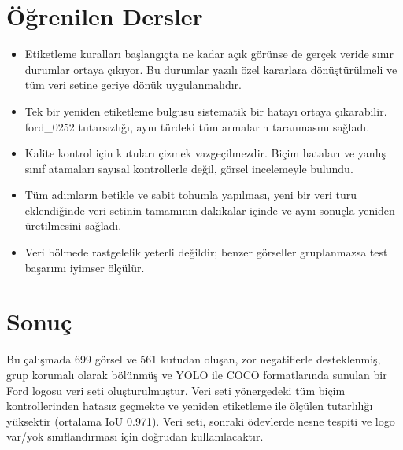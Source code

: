 \documentclass[conference]{IEEEtran}
\begin{document}
\section{Öğrenilen Dersler}

\begin{itemize}
\item Etiketleme kuralları başlangıçta ne kadar açık görünse de gerçek veride sınır durumlar
ortaya çıkıyor. Bu durumlar yazılı özel kararlara dönüştürülmeli ve tüm veri setine geriye
dönük uygulanmalıdır.
\item Tek bir yeniden etiketleme bulgusu sistematik bir hatayı ortaya çıkarabilir. ford\_0252
tutarsızlığı, aynı türdeki tüm armaların taranmasını sağladı.
\item Kalite kontrol için kutuları çizmek vazgeçilmezdir. Biçim hataları ve yanlış sınıf
atamaları sayısal kontrollerle değil, görsel incelemeyle bulundu.
\item Tüm adımların betikle ve sabit tohumla yapılması, yeni bir veri turu eklendiğinde veri
setinin tamamının dakikalar içinde ve aynı sonuçla yeniden üretilmesini sağladı.
\item Veri bölmede rastgelelik yeterli değildir; benzer görseller gruplanmazsa test başarımı
iyimser ölçülür.
\end{itemize}

\section{Sonuç}

Bu çalışmada 699 görsel ve 561 kutudan oluşan, zor negatiflerle desteklenmiş, grup korumalı
olarak bölünmüş ve YOLO ile COCO formatlarında sunulan bir Ford logosu veri seti
oluşturulmuştur. Veri seti yönergedeki tüm biçim kontrollerinden hatasız geçmekte ve
yeniden etiketleme ile ölçülen tutarlılığı yüksektir (ortalama IoU 0.971). Veri seti,
sonraki ödevlerde nesne tespiti ve logo var/yok sınıflandırması için doğrudan
kullanılacaktır.
\end{document}
